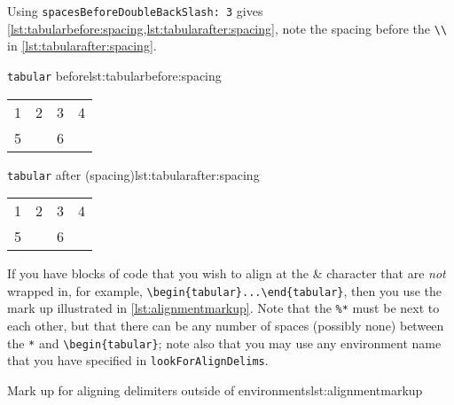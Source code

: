 \documentclass[11pt]{article}
\begin{document}
\begin{itemize}
    Using  \lstinline!spacesBeforeDoubleBackSlash: 3! gives \cref{lst:tabularbefore:spacing,lst:tabularafter:spacing}, 
    note the spacing before the \lstinline!\\! in \cref{lst:tabularafter:spacing}.

	\begin{minipage}{.5\textwidth}
		\begin{cmhlistings}[style=demo,columns=fixed]{\lstinline!tabular! before}{lst:tabularbefore:spacing}
\begin{tabular}{cccc}
1&	2 &3       &4\\
5& &6       &\\
\end{tabular}
		\end{cmhlistings}
	\end{minipage}%
	\begin{minipage}{.5\textwidth}
		\begin{cmhlistings}[style=demo,columns=fixed]{\lstinline!tabular! after (spacing)}{lst:tabularafter:spacing}
\begin{tabular}{cccc}
 1 & 2 & 3 & 4   \\
 5 &   & 6 &   \\
\end{tabular}
		\end{cmhlistings}
	\end{minipage}

	


	If you have blocks of code that you wish to align at the \&  character that
	      are \emph{not} wrapped in, for example, \lstinline!\begin{tabular}...\end{tabular}!, then you use the mark up
	      illustrated in \cref{lst:alignmentmarkup}. Note that the \lstinline!%*! must be next to
	      each other, but that there can be any number of spaces (possibly none) between the
	      \lstinline!*! and \lstinline!\begin{tabular}!; note also that you may use any
	      environment name that you have specified in \lstinline!lookForAlignDelims!.
	      \begin{cmhlistings}[style=demo,columns=fixed]{Mark up for aligning delimiters outside of environments}{lst:alignmentmarkup}
	\end{cmhlistings}


\end{itemize}
\end{document}
